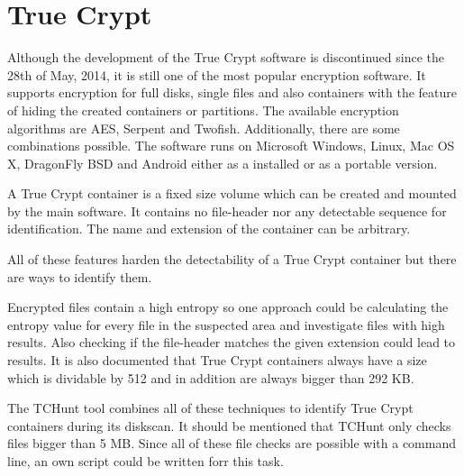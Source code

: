 \section{True Crypt}
Although the development of the True Crypt software is discontinued since the 28th of May, 2014, it is still one of the most popular encryption software.
It supports encryption for full disks, single files and also containers with the feature of hiding the created containers or partitions.
The available encryption algorithms are AES, Serpent and Twofish. Additionally, there are some combinations possible.
The software runs on Microsoft Windows, Linux, Mac OS X, DragonFly BSD and Android either as a installed or as a portable version.\cite{truecrypt}

A True Crypt container is a fixed size volume which can be created and mounted by the main software.
It contains no file-header nor any detectable sequence for identification.
The name and extension of the container can be arbitrary.

All of these features harden the detectability of a True Crypt container but there are ways to identify them.

Encrypted files contain a high entropy so one approach could be calculating the entropy value for every file in the suspected area and investigate files with high results.
Also checking if the file-header matches the given extension could lead to results.
It is also documented \cite{truecrypt_containerSize} that True Crypt containers always have a size which is dividable by 512 and in addition are always bigger than 292 KB.

The TCHunt tool combines all of these techniques to identify True Crypt containers during its diskscan. It should be mentioned that TCHunt only checks files bigger than 5 MB.
Since all of these file checks are possible with a command line, an own script could be written forr this task.
